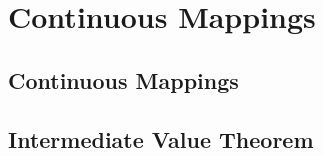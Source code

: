 \chapter{Continuous Mappings}

\section{Continuous Mappings}



\section{Intermediate Value Theorem}


